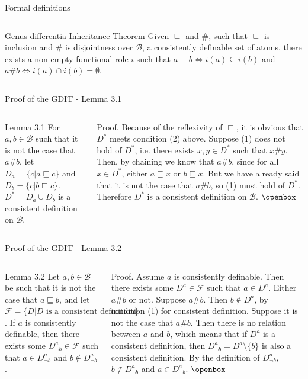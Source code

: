 \documentclass{beamer}
\begin{document}
\begin{frame}{Formal definitions}
\begin{columns}
\begin{block}{Genus-differentia Inheritance Theorem}
 Given $\sqsubseteq $ and $\#$,  such that $\sqsubseteq $ is inclusion and $\#$ is disjointness over $\mathcal{B}$, a consistently definable set of atoms, there exists a non-empty functional role $i$ such that $a\sqsubseteq b\Leftrightarrow i(a)\subseteq i(b)$  and $a\#b\Leftrightarrow i(a)\cap i(b)=\emptyset$.
\end{block}
\end{columns}
\end{frame}

\begin{frame}{Proof of the GDIT - Lemma 3.1}
\begin{columns}
\begin{block}{Lemma 3.1}
For $a,b\in\mathcal{B}$ such that it is not the case that $a\#b$, let $D_a=\{c\vert a\sqsubseteq c\}$ and $D_b=\{c\vert b\sqsubseteq c\}$. $D^*=D_a\cup D_b$ is a consistent definition on $\mathcal{B}$.
\end{block}
Proof. Because of the reflexivity of $\sqsubseteq$, it is obvious that  $D^*$ meets condition (2) above. Suppose (1) does not hold of $D^*$, i.e. there exists $x,y\in D^*$ such that $x\#y$. Then, by chaining we know that $a\#b$, since for all $x\in D^*$, either $a\sqsubseteq x$ or $b\sqsubseteq x$. But we have already said that it is not the case that $a\#b$, so (1) must hold of $D^*$. Therefore $D^*$ is a consistent definition on $\mathcal{B}$. \hfill $\openbox$
\end{columns}
\end{frame}

\begin{frame}{Proof of the GDIT - Lemma 3.2}
\begin{columns}
\begin{block}{Lemma 3.2}
Let $a,b\in\mathcal{B}$ be such that it is not the case that $a\sqsubseteq b$, and let $\mathcal{F}=\{D\vert D\text{ is a consistent definition}\}$. If $a$ is consistently definable, then there exists some $D_{\lnot b}^a\in\mathcal{F}$ such that $a\in D_{\lnot b}^a$ and $b\notin D_{\lnot b}^a$.
\end{block}

Proof. Assume $a$ is consistently definable. Then there exists some $D^a\in\mathcal{F}$ such that $a\in D^a$. Either $a\# b$ or not. Suppose $a\#b$. Then $b\notin D^a$, by condition (1) for consistent definition. Suppose it is not the case that $a\#b$. Then there is no relation between $a$ and $b$, which means that if $D^a$ is a consistent definition, then $D_{\lnot b}^a=D^a\setminus\{b\}$ is also a consistent definition. By the definition of $D_{\lnot b}^a$, $b\notin D_{\lnot b}^a$ and $a\in D_{\lnot b}^a$. \hfill $\openbox$
\end{columns}
\end{frame}
\end{document}
